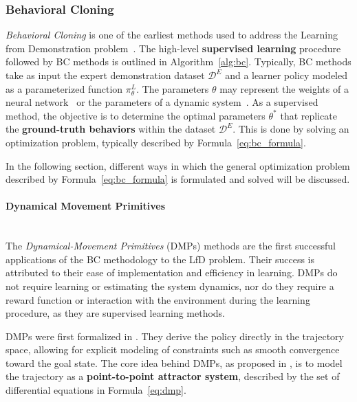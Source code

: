 \subsubsection{Behavioral Cloning}
\label{sec:bc}

\textit{Behavioral Cloning} is one of the earliest methods used to address the Learning from Demonstration problem~\cite{pomerleau1988alvinn}. The high-level \textbf{supervised learning} procedure followed by BC methods is outlined in Algorithm~\ref{alg:bc}. Typically, BC methods take as input the expert demonstration dataset $\mathcal{D}^{E}$ and a learner policy modeled as a parameterized function $\pi_{\theta}^{L}$. The parameters $\theta$ may represent the weights of a neural network~\cite{pomerleau1988alvinn} or the parameters of a dynamic system~\cite{ijspeert2002learning}. As a supervised method, the objective is to determine the optimal parameters $\theta^{*}$ that replicate the \textbf{ground-truth behaviors} within the dataset $\mathcal{D}^{E}$. This is done by solving an optimization problem, typically described by Formula~\ref{eq:bc_formula}.



In the following section, different ways in which the general optimization problem described by Formula~\ref{eq:bc_formula} is formulated and solved will be discussed.

\paragraph*{Dynamical Movement Primitives}\mbox{}\\
The \textit{Dynamical-Movement Primitives} (DMPs) methods are the first successful applications of the BC methodology to the LfD problem. Their success is attributed to their ease of implementation and efficiency in learning. DMPs do not require learning or estimating the system dynamics, nor do they require a reward function or interaction with the environment during the learning procedure, as they are supervised learning methods.

DMPs were first formalized in \cite{ijspeert2002learning}. They derive the policy directly in the trajectory space, allowing for explicit modeling of constraints such as smooth convergence toward the goal state. The core idea behind DMPs, as proposed in \cite{ijspeert2002learning,ijspeert2013dynamical}, is to model the trajectory as a \textbf{point-to-point attractor system}, described by the set of differential equations in Formula~\ref{eq:dmp}.


